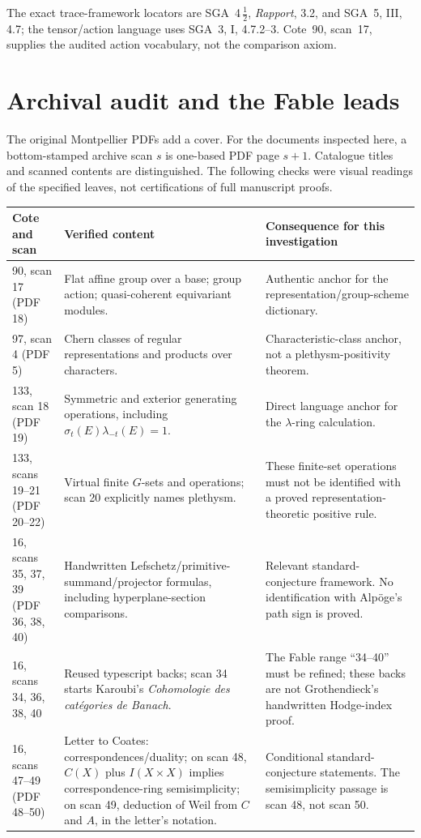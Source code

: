 \documentclass[11pt,a4paper]{article}
\theoremstyle{named}\newtheorem{finding}{Finding}[section]
\theoremstyle{definition}\newtheorem{definition}[finding]{Definition}
\theoremstyle{remark}\newtheorem{remark}[finding]{Remark}
\begin{document}
The exact trace-framework locators are SGA~4\,$\frac12$, \emph{Rapport}, 3.2, and SGA~5, III, 4.7; the tensor/action language uses SGA~3, I, 4.7.2--3. Cote~90, scan~17, supplies the audited action vocabulary, not the comparison axiom.

\section{Archival audit and the Fable leads}\label{sec:archive}
The original Montpellier PDFs add a cover. For the documents inspected here, a bottom-stamped archive scan $s$ is one-based PDF page $s+1$. Catalogue titles and scanned contents are distinguished. The following checks were visual readings of the specified leaves, not certifications of full manuscript proofs.

{\small\begin{longtable}{p{.19\linewidth}p{.36\linewidth}p{.37\linewidth}}
\toprule Cote and scan&Verified content&Consequence for this investigation\\\midrule\endhead
90, scan 17 (PDF 18)&Flat affine group over a base; group action; quasi-coherent equivariant modules.&Authentic anchor for the representation/group-scheme dictionary.\\
97, scan 4 (PDF 5)&Chern classes of regular representations and products over characters.&Characteristic-class anchor, not a plethysm-positivity theorem.\\
133, scan 18 (PDF 19)&Symmetric and exterior generating operations, including $\sigma_t(E)\lambda_{-t}(E)=1$.&Direct language anchor for the $\lambda$-ring calculation.\\
133, scans 19--21 (PDF 20--22)&Virtual finite $G$-sets and operations; scan 20 explicitly names plethysm.&These finite-set operations must not be identified with a proved representation-theoretic positive rule.\\
16, scans 35, 37, 39 (PDF 36, 38, 40)&Handwritten Lefschetz/primitive-summand/projector formulas, including hyperplane-section comparisons.&Relevant standard-conjecture framework. No identification with Alp\"oge's path sign is proved.\\
16, scans 34, 36, 38, 40&Reused typescript backs; scan 34 starts Karoubi's \emph{Cohomologie des cat\'egories de Banach}.&The Fable range ``34--40'' must be refined; these backs are not Grothendieck's handwritten Hodge-index proof.\\
16, scans 47--49 (PDF 48--50)&Letter to Coates: correspondences/duality; on scan 48, $C(X)$ plus $I(X\times X)$ implies correspondence-ring semisimplicity; on scan 49, deduction of Weil from $C$ and $A$, in the letter's notation.&Conditional standard-conjecture statements. The semisimplicity passage is scan 48, not scan 50.\\

\end{longtable}}
\end{document}
